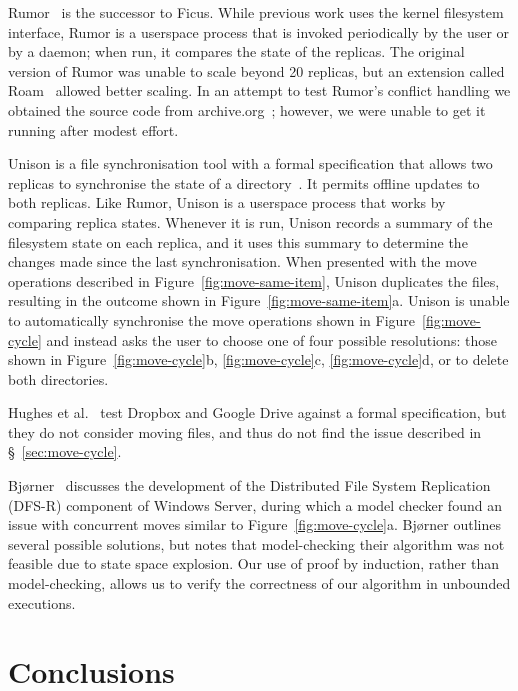 \documentclass[sigplan,anonymous]{acmart}
\begin{document}
Rumor~\cite{Guy:1999gy,RumorManual} is the successor to Ficus.
While previous work uses the kernel filesystem interface, Rumor is a userspace process that is invoked periodically by the user or by a daemon; when run, it compares the state of the replicas.
The original version of Rumor was unable to scale beyond 20 replicas, but an extension called Roam~\cite{Ratner:1999fh} allowed better scaling. 
In an attempt to test Rumor's conflict handling we obtained the source code from archive.org~\cite{RumorSource}; however, we were unable to get it running after modest effort.

Unison is a file synchronisation tool with a formal specification that allows two replicas to synchronise the state of a directory~\cite{PierceVouillon:UnisonSpecTR}.
It permits offline updates to both replicas.
Like Rumor, Unison is a userspace process that works by comparing replica states.
Whenever it is run, Unison records a summary of the filesystem state on each replica, and it uses this summary to determine the changes made since the last synchronisation. 
When presented with the move operations described in Figure~\ref{fig:move-same-item}, Unison duplicates the files, resulting in the outcome shown in Figure~\ref{fig:move-same-item}a. 
Unison is unable to automatically synchronise the move operations shown in Figure~\ref{fig:move-cycle} and instead asks the user to choose one of four possible resolutions: those shown in Figure~\ref{fig:move-cycle}b, \ref{fig:move-cycle}c, \ref{fig:move-cycle}d, or to delete both directories.

Hughes et al.~\cite{Hughes:2016fp} test Dropbox and Google Drive against a formal specification, but they do not consider moving files, and thus do not find the issue described in \S~\ref{sec:move-cycle}.

Bj{\o}rner~\cite{Bjorner:2007hp} discusses the development of the Distributed File System Replication (DFS-R) component of Windows Server, during which a model checker found an issue with concurrent moves similar to Figure~\ref{fig:move-cycle}a.
Bj{\o}rner outlines several possible solutions, but notes that model-checking their algorithm was not feasible due to state space explosion.
Our use of proof by induction, rather than model-checking, allows us to verify the correctness of our algorithm in unbounded executions.

\section{Conclusions}
\end{document}
